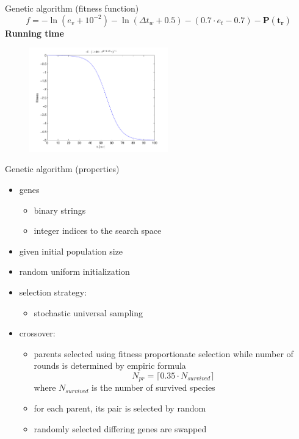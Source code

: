 \documentclass{beamer}
\begin{document}
\begin{frame}{Genetic algorithm (fitness function)}
\[ f = -\ln(e_v+10^{-2 }) - \ln(\Delta t_w+0.5) - (0.7\cdot e_t-0.7) - \mathbf{P(t_r)} \]
\centering
\textbf{Running time}
\begin{figure}[h] %
		\includegraphics[width=60mm]{fit_tr}
		\label{fit_tr}
\end{figure}
\end{frame}

\begin{frame}{Genetic algorithm (properties)}
\begin{itemize}
	\item genes \pause
	\begin{itemize}
		\item binary strings
		\item integer indices to the search space
	\end{itemize}\pause
	\item given initial population size\pause
	\item random uniform initialization\pause
	\item selection strategy:\pause
	\begin{itemize}
		\item stochastic universal sampling\pause
	\end{itemize}
	\item crossover:\pause
	\begin{itemize}
		\item parents selected using fitness proportionate selection \pause
		 while number of rounds is determined by empiric formula
		\[ N_{pr} = \lceil 0.35\cdot N_{survived} \rceil \]
		where $ N_{survived} $ is the number of survived species\pause
		\item for each parent, its pair is selected by random\pause
		\item randomly selected differing genes are swapped
	\end{itemize}
\end{itemize}
\end{frame}
\end{document}
